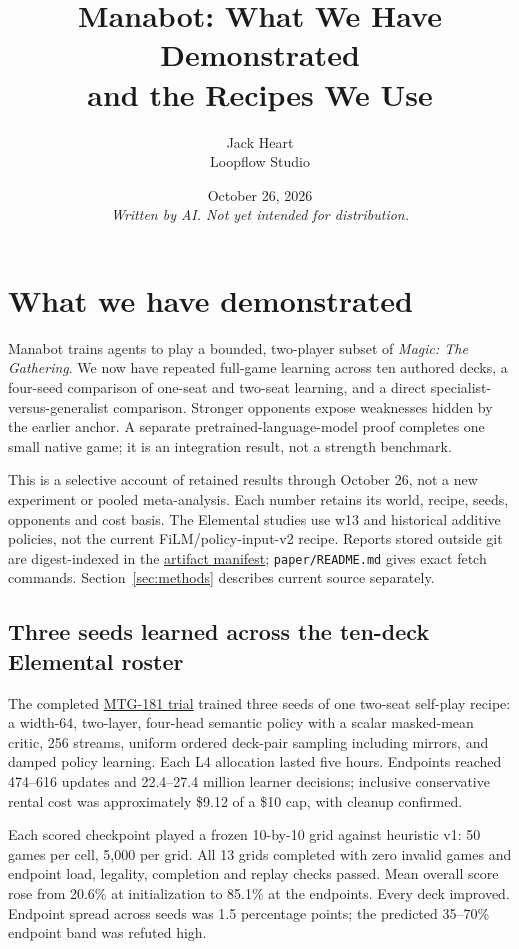 \documentclass[11pt]{article}
\title{\textbf{Manabot}: What We Have Demonstrated\\and the Recipes We Use}
\author{Jack Heart\\\small Loopflow Studio}
\date{October 26, 2026\\[0.5em]\small\textit{Written by AI. Not yet intended for distribution.}}
\newcommand{\code}[1]{\texttt{\small #1}}
\newcommand{\source}[2]{\href{https://github.com/loopflowstudio/manabot/blob/558e0186b585228dd2130cf14d9cb40de217e66f/#1}{#2}}
\newcommand{\report}[2]{\source{experiments/#1}{#2}}
\begin{document}
\maketitle

\section{What we have demonstrated}

Manabot trains agents to play a bounded, two-player subset of \textit{Magic: The Gathering}. We now have repeated full-game learning across ten authored decks, a four-seed comparison of one-seat and two-seat learning, and a direct specialist-versus-generalist comparison. Stronger opponents expose weaknesses hidden by the earlier anchor. A separate pretrained-language-model proof completes one small native game; it is an integration result, not a strength benchmark.

This is a selective account of retained results through October 26, not a new experiment or pooled meta-analysis. Each number retains its world, recipe, seeds, opponents and cost basis. The Elemental studies use w13 and historical additive policies, not the current FiLM/policy-input-v2 recipe. Reports stored outside git are digest-indexed in the \report{data.manifest.json}{artifact manifest}; \code{paper/README.md} gives exact fetch commands. Section~\ref{sec:methods} describes current source separately.

\subsection{Three seeds learned across the ten-deck Elemental roster}

The completed \report{protocols/elemental-181.md}{MTG-181 trial} trained three seeds of one two-seat self-play recipe: a width-64, two-layer, four-head semantic policy with a scalar masked-mean critic, 256 streams, uniform ordered deck-pair sampling including mirrors, and damped policy learning. Each L4 allocation lasted five hours. Endpoints reached 474--616 updates and 22.4--27.4 million learner decisions; inclusive conservative rental cost was approximately \$9.12 of a \$10 cap, with cleanup confirmed.

Each scored checkpoint played a frozen 10-by-10 grid against heuristic v1: 50 games per cell, 5,000 per grid. All 13 grids completed with zero invalid games and endpoint load, legality, completion and replay checks passed. Mean overall score rose from 20.6\% at initialization to 85.1\% at the endpoints. Every deck improved. Endpoint spread across seeds was 1.5 percentage points; the predicted 35--70\% endpoint band was refuted high.
\end{document}
